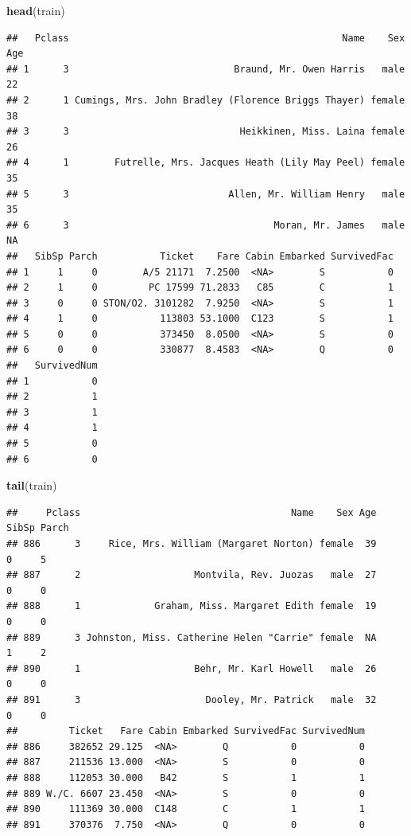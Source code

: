 \documentclass[]{article}
\newenvironment{Shaded}{\begin{snugshade}}{\end{snugshade}}
\newcommand{\KeywordTok}[1]{\textcolor[rgb]{0.13,0.29,0.53}{\textbf{#1}}}
\newcommand{\NormalTok}[1]{#1}
\begin{document}
\begin{Shaded}
\begin{Highlighting}[]
\KeywordTok{head}\NormalTok{(train)}
\end{Highlighting}
\end{Shaded}

\begin{verbatim}
##   Pclass                                                Name    Sex Age
## 1      3                             Braund, Mr. Owen Harris   male  22
## 2      1 Cumings, Mrs. John Bradley (Florence Briggs Thayer) female  38
## 3      3                              Heikkinen, Miss. Laina female  26
## 4      1        Futrelle, Mrs. Jacques Heath (Lily May Peel) female  35
## 5      3                            Allen, Mr. William Henry   male  35
## 6      3                                    Moran, Mr. James   male  NA
##   SibSp Parch           Ticket    Fare Cabin Embarked SurvivedFac
## 1     1     0        A/5 21171  7.2500  <NA>        S           0
## 2     1     0         PC 17599 71.2833   C85        C           1
## 3     0     0 STON/O2. 3101282  7.9250  <NA>        S           1
## 4     1     0           113803 53.1000  C123        S           1
## 5     0     0           373450  8.0500  <NA>        S           0
## 6     0     0           330877  8.4583  <NA>        Q           0
##   SurvivedNum
## 1           0
## 2           1
## 3           1
## 4           1
## 5           0
## 6           0
\end{verbatim}

\begin{Shaded}
\begin{Highlighting}[]
\KeywordTok{tail}\NormalTok{(train)}
\end{Highlighting}
\end{Shaded}

\begin{verbatim}
##     Pclass                                     Name    Sex Age SibSp Parch
## 886      3     Rice, Mrs. William (Margaret Norton) female  39     0     5
## 887      2                    Montvila, Rev. Juozas   male  27     0     0
## 888      1             Graham, Miss. Margaret Edith female  19     0     0
## 889      3 Johnston, Miss. Catherine Helen "Carrie" female  NA     1     2
## 890      1                    Behr, Mr. Karl Howell   male  26     0     0
## 891      3                      Dooley, Mr. Patrick   male  32     0     0
##         Ticket   Fare Cabin Embarked SurvivedFac SurvivedNum
## 886     382652 29.125  <NA>        Q           0           0
## 887     211536 13.000  <NA>        S           0           0
## 888     112053 30.000   B42        S           1           1
## 889 W./C. 6607 23.450  <NA>        S           0           0
## 890     111369 30.000  C148        C           1           1
## 891     370376  7.750  <NA>        Q           0           0
\end{verbatim}
\end{document}
